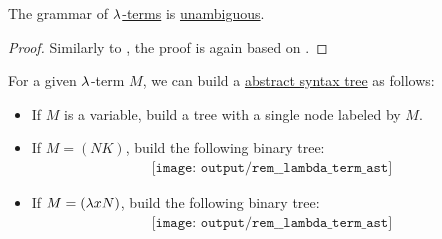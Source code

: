 \begin{proposition}\label{thm:lambda_terms_are_unambiguous}
  The grammar of \hyperref[def:lambda_term]{\( \mathrm{\lambda} \)-terms} is \hyperref[def:grammar_ambiguity]{unambiguous}.
\end{proposition}
\begin{proof}
  Similarly to , the proof is again based on .
\end{proof}

\begin{remark}\label{rem:lambda_term_ast}
  For a given \( \mathrm{\lambda} \)-term \( M \), we can build a \hyperref[rem:abstract_syntax_tree]{abstract syntax tree} as follows:
  \begin{itemize}
    \item If \( M \) is a variable, build a tree with a single node labeled by \( M \).
    \item If \( M = (NK) \), build the following binary tree:
    \begin{equation*}
      \begin{aligned}
        \texttt{[image: output/rem\_\_lambda\_term\_ast]}
      \end{aligned}
    \end{equation*}

    \item If \( M = (\mathrm{\lambda} x N) \), build the following binary tree:
    \begin{equation*}
      \begin{aligned}
        \texttt{[image: output/rem\_\_lambda\_term\_ast]}
      \end{aligned}
    \end{equation*}
  \end{itemize}
\end{remark}

